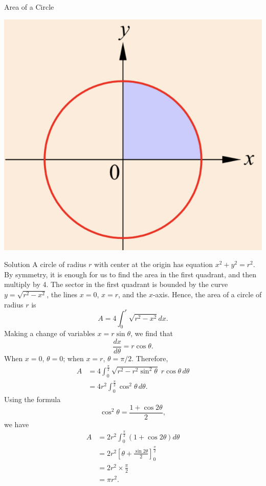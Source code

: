 \begin{example}[label=20230527]{}
\begin{example}{Area of a Circle}
 
\begin{center}
\includegraphics[scale=0.2]{Picture45.png}\end{center}
 
 
\end{example}
 
\begin{solution}{Solution}
A circle of radius $r$ with center at the origin has equation $x^2+y^2=r^2$. By symmetry, it is enough for us to find the area in the first quadrant, and then multiply by 4. The sector in the first quadrant is bounded by the curve $y=\sqrt{r^2-x^2}$, the lines $x=0$, $x=r$, and the $x$-axis.  Hence, the area of a circle of radius $r$ is
\[A=4\int_0^{r}\sqrt{r^2-x^2}dx.\]
Making a change of variables $x=r\sin\theta$, we find that 
\[\frac{dx}{d\theta}=r\cos\theta.\]When $x=0$, $\theta=0$; when $x=r$, $\theta=\pi/2$. Therefore,
\begin{align*}
A&=4\int_0^{\frac{\pi}{2}}\sqrt{r^2-r^2\sin^2\theta}\;r\cos\theta \,d\theta\\&=4r^2\int_0^{\frac{\pi}{2}}\cos^2\theta\,d\theta.\end{align*}
 Using the formula
\[\cos^2\theta=\frac{1+\cos 2\theta}{2},\]
we have
\begin{align*}A &=2r^2\int_0^{\frac{\pi}{2}}\left(1+\cos2\theta\right)d\theta \\&=2r^2\left[\theta+\frac{\sin2\theta}{2}\right]_0^{\frac{\pi}{2}} \\&=2r^2\times\frac{\pi}{2}\\&=\pi r^2.\end{align*}
\end{solution}

\end{example}
